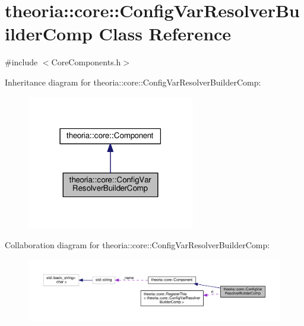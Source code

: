 \hypertarget{classtheoria_1_1core_1_1ConfigVarResolverBuilderComp}{}\section{theoria\+:\+:core\+:\+:Config\+Var\+Resolver\+Builder\+Comp Class Reference}
\label{classtheoria_1_1core_1_1ConfigVarResolverBuilderComp}


{\ttfamily \#include $<$Core\+Components.\+h$>$}



Inheritance diagram for theoria\+:\+:core\+:\+:Config\+Var\+Resolver\+Builder\+Comp\+:\nopagebreak
\begin{figure}[H]
\begin{center}
\leavevmode
\includegraphics[width=207pt]{classtheoria_1_1core_1_1ConfigVarResolverBuilderComp__inherit__graph}
\end{center}
\end{figure}


Collaboration diagram for theoria\+:\+:core\+:\+:Config\+Var\+Resolver\+Builder\+Comp\+:\nopagebreak
\begin{figure}[H]
\begin{center}
\leavevmode
\includegraphics[width=350pt]{classtheoria_1_1core_1_1ConfigVarResolverBuilderComp__coll__graph}
\end{center}
\end{figure}
